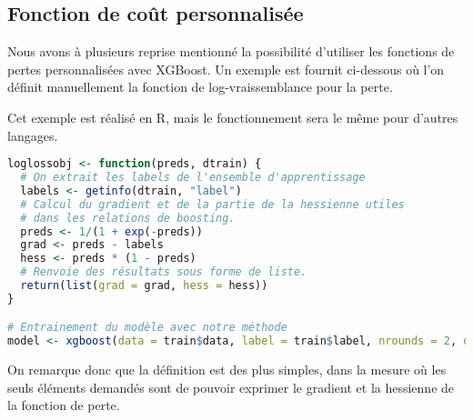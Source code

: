 \subsection{Fonction de coût personnalisée}
Nous avons à plusieurs reprise mentionné la possibilité d'utiliser les fonctions de pertes personnalisées avec XGBoost. Un exemple est fournit ci-dessous où l'on définit manuellement la fonction de log-vraissemblance pour la perte.

Cet exemple est réalisé en R, mais le fonctionnement sera le même pour d'autres langages.
\begin{lstlisting}[language=R]
loglossobj <- function(preds, dtrain) {
  # On extrait les labels de l'ensemble d'apprentissage
  labels <- getinfo(dtrain, "label")
  # Calcul du gradient et de la partie de la hessienne utiles 
  # dans les relations de boosting.
  preds <- 1/(1 + exp(-preds))
  grad <- preds - labels
  hess <- preds * (1 - preds)
  # Renvoie des résultats sous forme de liste.
  return(list(grad = grad, hess = hess))
}

# Entrainement du modèle avec notre méthode
model <- xgboost(data = train$data, label = train$label, nrounds = 2, objective = loglossobj, eval_metric = "error")
\end{lstlisting}

On remarque donc que la définition est des plus simples, dans la mesure où les seuls éléments demandés sont de pouvoir exprimer le gradient et la hessienne de la fonction de perte.
